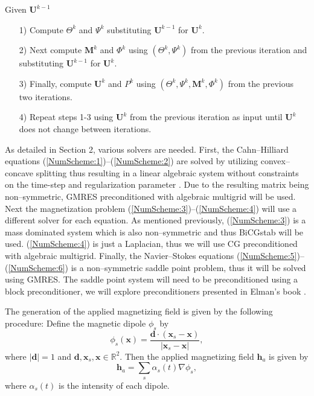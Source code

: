 \documentclass[11pt,fullpage]{article}
\newcommand{\Real}{\mathbb R}
\newcommand{\abs}[1]{\left\vert#1\right\vert}
\newcommand{\grad}{\nabla}
\theoremstyle{lemma}
\theoremstyle{definition}
\theoremstyle{lemma}
\begin{document}
Given $\mathbf{U}^{k-1}$ 
\begin{itemize}
	\item[1)] Compute $\Theta^k$ and $\Psi^k$ substituting $\mathbf{U}^{k-1}$ for $\mathbf{U}^{k}$.
	
	\item[2)] Next compute $\mathbf{M}^k$ and $\Phi^k$ using $(\Theta^k,\Psi^k)$ from the previous iteration and substituting $\mathbf{U}^{k-1}$ for $\mathbf{U}^{k}$.
	
	\item[3)] Finally, compute $\mathbf{U}^k$ and $P^k$ using $(\Theta^k,\Psi^k, \mathbf{M}^k, \Phi^k)$ from the previous two iterations.
	
	\item[4)] Repeat steps 1-3 using $\mathbf{U}^k$ from the previous iteration as input until $\mathbf{U}^k$ does not change between iterations.
\end{itemize}

As detailed in Section 2, various solvers are needed. First, the Cahn--Hilliard equations (\ref{NumScheme:1})--(\ref{NumScheme:2}) are solved by utilizing convex--concave splitting thus resulting in a linear algebraic system without constraints on the time-step and regularization parameter \cite{CahnHilliard}. Due to the resulting matrix being non--symmetric, GMRES preconditioned with algebraic multigrid will be used. Next the magnetization problem (\ref{NumScheme:3})--(\ref{NumScheme:4}) will use a different solver for each equation. As mentioned previously, (\ref{NumScheme:3}) is a mass dominated system which is also non--symmetric and thus BiCGstab will be used. (\ref{NumScheme:4}) is just a Laplacian, thus we will use CG preconditioned with algebraic multigrid. Finally, the Navier--Stokes equations (\ref{NumScheme:5})--(\ref{NumScheme:6}) is a non--symmetric saddle point problem, thus it will be solved using GMRES. The saddle point system will need to be preconditioned using a block preconditioner, we will explore preconditioners presented in Elman's book \cite{Precond}.

The generation of the applied magnetizing field is given by the following procedure: Define the magnetic dipole $\phi_s$ by
$$
\phi_s(\mathbf{x}) = \frac{\mathbf{d}\cdot(\mathbf{x}_s - \mathbf{x})}{\abs{\mathbf{x}_s - \mathbf{x}}}, 
$$
where $\abs{\mathbf{d}}=1$ and $\mathbf{d},\mathbf{x}_s,\mathbf{x}\in\Real^2$. Then the applied magnetizing field $\mathbf{h}_a$ is given by
$$
\mathbf{h}_a = \sum_s \alpha_s(t) \grad\phi_s,
$$
where $\alpha_s(t)$ is the intensity of each dipole.
\end{document}
